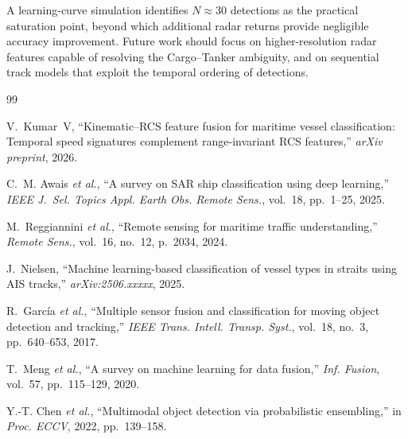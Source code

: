 \documentclass[10pt,journal,compsoc]{IEEEtran}
\begin{document}
A learning-curve simulation identifies $N \approx 30$ detections as the
practical saturation point, beyond which additional radar returns provide
negligible accuracy improvement.  Future work should focus on higher-resolution
radar features capable of resolving the Cargo--Tanker ambiguity, and on
sequential track models that exploit the temporal ordering of detections.


\begin{thebibliography}{99}

V.~Kumar~V, ``Kinematic--RCS feature fusion for maritime vessel classification:
Temporal speed signatures complement range-invariant RCS features,''
\emph{arXiv preprint}, 2026.

C.~M. Awais \emph{et al.}, ``A survey on SAR ship classification using deep
learning,'' \emph{IEEE J.~Sel. Topics Appl. Earth Obs. Remote Sens.},
vol.~18, pp.~1--25, 2025.

M.~Reggiannini \emph{et al.}, ``Remote sensing for maritime traffic
understanding,'' \emph{Remote Sens.}, vol.~16, no.~12, p.~2034, 2024.

J.~Nielsen, ``Machine learning-based classification of vessel types in straits
using AIS tracks,'' \emph{arXiv:2506.xxxxx}, 2025.

R.~Garc\'ia \emph{et al.}, ``Multiple sensor fusion and classification for
moving object detection and tracking,'' \emph{IEEE Trans. Intell. Transp.
Syst.}, vol.~18, no.~3, pp.~640--653, 2017.

T.~Meng \emph{et al.}, ``A survey on machine learning for data fusion,''
\emph{Inf. Fusion}, vol.~57, pp.~115--129, 2020.

Y.-T. Chen \emph{et al.}, ``Multimodal object detection via probabilistic
ensembling,'' in \emph{Proc. ECCV}, 2022, pp.~139--158.

\end{thebibliography}
\end{document}

